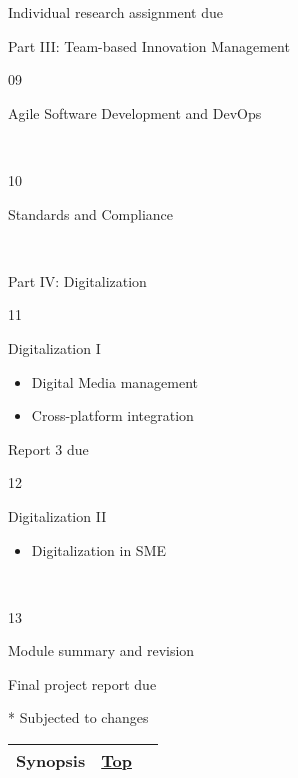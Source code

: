 {Individual research assignment due}

{Part III: Team-based Innovation Management}

{09}

{Agile Software Development and DevOps}\\
\hspace*{0.333em}

~

{10}

{Standards and Compliance}\\
\hspace*{0.333em}

~

{Part IV: Digitalization}

{11}

{Digitalization I}

\begin{itemize}
\tightlist
\item
  {Digital Media management}
\item
  {Cross-platform integration}
\end{itemize}

{Report 3 due}

{12}

{Digitalization II}

\begin{itemize}
\tightlist
\item
  {Digitalization in SME}
\end{itemize}

~

{13}

{Module summary and revision}

{Final project report due}

{* Subjected to changes}\\
\hspace*{0.333em}

\begin{longtable}[]{@{}ll@{}}
\toprule
{\protect\hypertarget{Synopsis}{}{}Synopsis} &
{\protect\hyperlink{top}{Top}~~}\tabularnewline
\bottomrule
\end{longtable}

